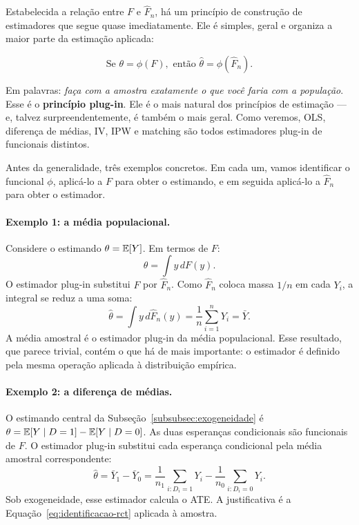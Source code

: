 Estabelecida a relação entre $F$ e $\hat{F}_n$, há um princípio de construção de estimadores que segue quase imediatamente. Ele é simples, geral e organiza a maior parte da estimação aplicada:

\begin{equation}
\text{Se } \theta = \phi(F),\text{ então } \hat{\theta} = \phi(\hat{F}_n).
\label{eq:plug-in}
\end{equation}

Em palavras: \textit{faça com a amostra exatamente o que você faria com a população}. Esse é o \textbf{princípio plug-in}. Ele é o mais natural dos princípios de estimação --- e, talvez surpreendentemente, é também o mais geral. Como veremos, OLS, diferença de médias, IV, IPW e matching são todos estimadores plug-in de funcionais distintos.

Antes da generalidade, três exemplos concretos. Em cada um, vamos identificar o funcional $\phi$, aplicá-lo a $F$ para obter o estimando, e em seguida aplicá-lo a $\hat{F}_n$ para obter o estimador.

\paragraph{Exemplo 1: a média populacional.} Considere o estimando $\theta = \mathbb{E}[Y]$. Em termos de $F$:
\[
\theta = \int y \, dF(y).
\]
O estimador plug-in substitui $F$ por $\hat{F}_n$. Como $\hat{F}_n$ coloca massa $1/n$ em cada $Y_i$, a integral se reduz a uma soma:
\begin{equation}
\hat{\theta} = \int y \, d\hat{F}_n(y) = \frac{1}{n} \sum_{i=1}^n Y_i = \bar{Y}.
\label{eq:plug-in-media}
\end{equation}
A média amostral é o estimador plug-in da média populacional. Esse resultado, que parece trivial, contém o que há de mais importante: o estimador é definido pela mesma operação aplicada à distribuição empírica.

\paragraph{Exemplo 2: a diferença de médias.} O estimando central da Subseção~\ref{subsubsec:exogeneidade} é $\theta = \mathbb{E}[Y \mid D=1] - \mathbb{E}[Y \mid D=0]$. As duas esperanças condicionais são funcionais de $F$. O estimador plug-in substitui cada esperança condicional pela média amostral correspondente:
\begin{equation}
\hat{\theta} = \bar{Y}_1 - \bar{Y}_0 = \frac{1}{n_1} \sum_{i: D_i = 1} Y_i - \frac{1}{n_0} \sum_{i: D_i = 0} Y_i.
\label{eq:plug-in-dif-medias}
\end{equation}
Sob exogeneidade, esse estimador calcula o ATE. A justificativa é a Equação~\eqref{eq:identificacao-rct} aplicada à amostra.

